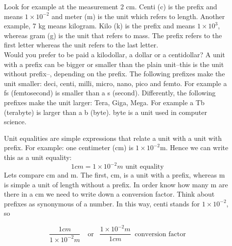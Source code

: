 \documentclass[main.tex]{subfiles}
\begin{document}
 



\sloppy
\begin{description}
\item[] Look for example at the measurement 2 cm. Centi (c) is the prefix and means $1\times10^{-2}$ and meter (m) is the unit which refers to length. Another example, 7 kg means kilogram. Kilo (k) is the prefix and means $1\times10^{3}$, whereas gram (g) is the unit that refers to mass. The prefix refers to the first letter whereas the unit refers to the last letter. \\
Would you prefer to be paid a kilodollar, a dollar or a centidollar? A unit with a prefix can be bigger or smaller than the plain unit--this is the unit without prefix--, depending on the prefix. The following prefixes make the unit smaller: deci, centi, milli, micro, nano, pico and femto. For example a fs (femtosecond) is smaller than a s (second). Differently, the following prefixes make the unit larger: Tera, Giga, Mega. For example a Tb (terabyte) is larger than a b (byte). byte is a unit used in computer science.

\item[] Unit equalities are simple expressions that relate a unit with a unit with prefix. For example: one centimeter (cm) is $1\times10^{-2}$m. Hence we can write this as a unit equality:
\begin{equation*}
\boxed{   1cm=1\times10^{-2}m}\text{ unit equality}    
\end{equation*}
Let\textquotesingle s compare cm and m. The first, cm, is a unit with a prefix, whereas m is simple a unit of length without a prefix. In order know how many m are there in a cm we need to write down a conversion factor. Think about prefixes as synonymous of a number. In this way, centi stands for  $1\times10^{-2}$, so


\begin{equation*}
\boxed{   \frac{1cm}{1\times10^{-2}m}\ \enspace \text{ or  } \enspace \frac{1\times10^{-2}m}{1cm} }  \  \text{ conversion factor}   
\end{equation*}
 \end{description}
\end{document}

